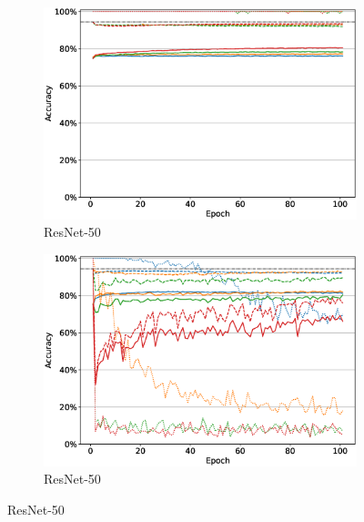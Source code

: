 \begin{figure}
\begin{subfigure}[b]{0.49\textwidth}
         \includegraphics[width=\textwidth]{images/finetuning/finetuning_protecting_content_smalllr_thesis_resnet50.eps}
         \caption{ResNet-50}
         \label{fig:finetuning_resnet50_smalllr}
     \end{subfigure}
     \hfill
     \begin{subfigure}[b]{0.49\textwidth}
         \centering
         \includegraphics[width=\textwidth]{images/finetuning/finetuning_protecting_content_largelr_thesis_resnet50.eps}
         \caption{ResNet-50}
         \label{fig:finetuning_resnet50_largelr}
     \end{subfigure}
     \hfill
     

\end{figure}
